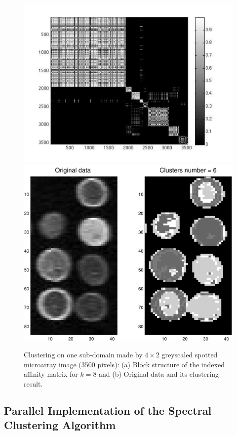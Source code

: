 \documentclass[]{svmult}
\begin{document}
\begin{figure}
  \begin{center}
    {\includegraphics[width=0.4\linewidth]{Aindexk8}}
    \hspace{0.2cm}
   {\includegraphics[width=0.35\linewidth]{Onesubdomain}}
 \end{center}
\caption{Clustering on one sub-domain made by $4 \times 2$ greyscaled spotted
microarray image (3500 pixels): (a) Block structure of the indexed affinity
matrix for $k=8$ and (b) Original data and its clustering result.}  
\label{fig:sparseaff}
\end{figure}

\vspace{-1.1cm}
\subsection{Parallel Implementation of the Spectral Clustering Algorithm}
\vspace{-0.3cm}
\end{document}
